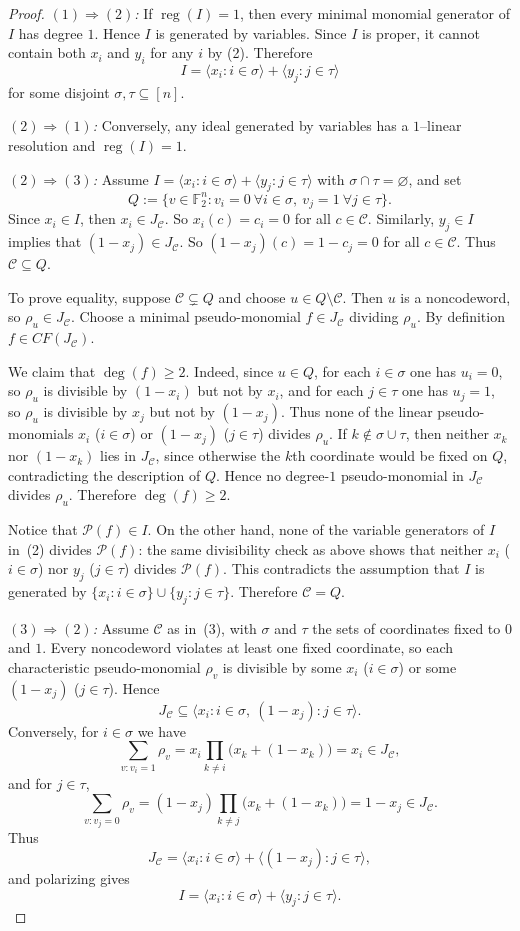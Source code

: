 \documentclass[12pt]{amsart}
\theoremstyle{remark}
\theoremstyle{definition}
\DeclareMathOperator{\reg}{reg}
\newcommand{\F}{\mathbb{F}}
\newcommand{\C}{\mathcal{C}}
\def\P{{\mathcal P}}
\begin{document}
\begin{proof}
\emph{$(1)\Rightarrow(2)$:}
If $\reg(I)=1$, then every minimal monomial generator of $I$ has degree $1$. Hence $I$ is generated by variables.
Since $I$ is proper, it cannot contain both $x_i$ and $y_i$ for any $i$ by (2).
Therefore
\[
I=\langle x_i:i\in\sigma\rangle+\langle y_j:j\in\tau\rangle
\]
for some disjoint $\sigma,\tau\subseteq[n]$.


\emph{$(2)\Rightarrow(1)$:}
Conversely, any ideal generated by variables has a $1$--linear resolution and $\reg(I)=1$.


\emph{$(2)\Rightarrow(3)$:}
Assume $I=\langle x_i:i\in\sigma\rangle+\langle y_j:j\in\tau\rangle$ with $\sigma\cap\tau=\varnothing$, and set
\[
Q:=\{ v\in\F_2^n : v_i=0\ \forall i\in\sigma,\ v_j=1\ \forall j\in\tau \}.
\]
Since $x_i\in I$, then $x_i\in J_\C$. So $x_i(c)=c_i=0$ for all $c\in\C$.
Similarly, $y_j\in I$ implies that $(1-x_j)\in J_\C$. So $(1-x_j)(c)=1-c_j=0$ for all $c\in\C$.
Thus $\C\subseteq Q$.

To prove equality, suppose $\C\subsetneq Q$ and choose $u\in Q\setminus \C$.
Then $u$ is a noncodeword, so $\rho_u\in J_\C$.
Choose a minimal pseudo-monomial $f\in J_\C$ dividing $\rho_u$. By definition
$f\in CF(J_\C)$.

We claim that $\deg(f)\ge 2$.
Indeed, since $u\in Q$, for each $i\in\sigma$ one has $u_i=0$, so $\rho_u$ is divisible by $(1-x_i)$ but
not by $x_i$, and for each $j\in\tau$ one has $u_j=1$, so $\rho_u$ is divisible by $x_j$ but not by $(1-x_j)$.
Thus none of the linear pseudo-monomials $x_i$ ($i\in\sigma$) or $(1-x_j)$ ($j\in\tau$) divides $\rho_u$.
If $k\notin\sigma\cup\tau$, then neither $x_k$ nor $(1-x_k)$ lies in $J_\C$, since otherwise the $k$th
coordinate would be fixed on $Q$, contradicting the description of $Q$.
Hence no degree-$1$ pseudo-monomial in $J_\C$ divides $\rho_u$. Therefore $\deg(f)\ge 2$.

Notice that $\P(f)\in I$.
On the other hand, none of the variable generators of $I$ in~(2) divides $\P(f)$: the same divisibility
check as above shows that neither $x_i$ ($i\in\sigma$) nor $y_j$ ($j\in\tau$) divides $\P(f)$.
This contradicts the assumption that $I$ is generated by $\{x_i:i\in\sigma\}\cup\{y_j:j\in\tau\}$.
Therefore $\C=Q$.


\emph{$(3)\Rightarrow(2)$:}
Assume $\C$ as in~(3), with $\sigma$ and $\tau$ the sets of coordinates fixed to $0$ and $1$.
Every noncodeword violates at least one fixed coordinate, so each characteristic pseudo-monomial $\rho_v$ is divisible by
some $x_i$ ($i\in\sigma$) or some $(1-x_j)$ ($j\in\tau$). Hence
\[
J_\C\subseteq \langle x_i:i\in\sigma,\ (1-x_j):j\in\tau\rangle.
\]
Conversely, for $i\in\sigma$ we have
\[
\sum_{v:  v_i=1}\rho_v
 = 
x_i\prod_{k\neq i}\bigl(x_k+(1-x_k)\bigr)
 = x_i\in J_\C,
\]
and for $j\in\tau$,
\[
\sum_{v:  v_j=0}\rho_v
 = 
(1-x_j)\prod_{k\neq j}\bigl(x_k+(1-x_k)\bigr)
 = 1-x_j\in J_\C.
\]
Thus
\[
J_\C=\langle x_i:i\in\sigma \rangle +\langle (1-x_j):j\in\tau\rangle,
\]
and polarizing gives
\[
I=\langle x_i:i\in\sigma\rangle+\langle y_j:j\in\tau\rangle.
\]



\end{proof}
\end{document}
